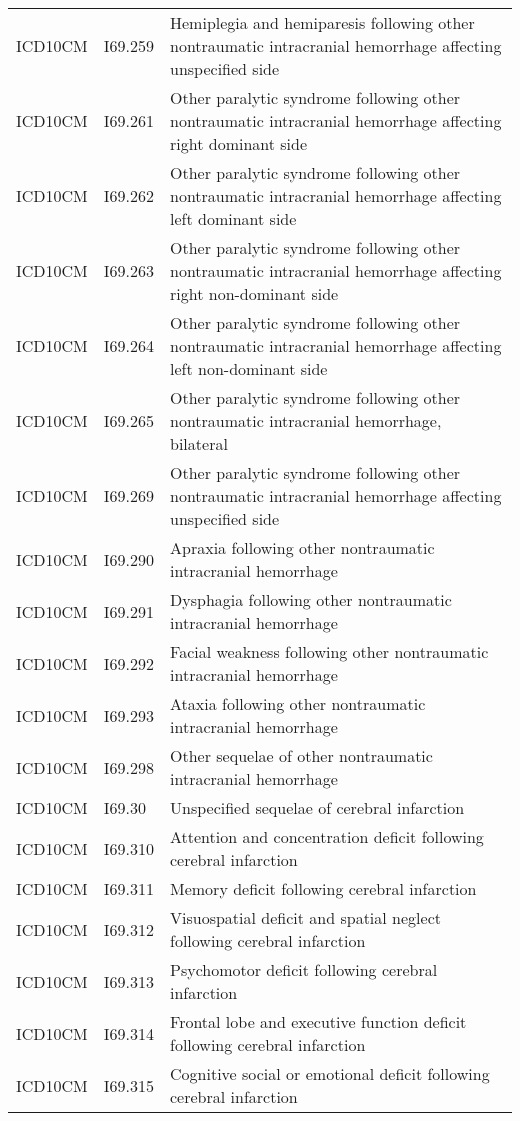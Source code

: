\begin{longtable}{p{}p{}p{}}
  ICD10CM & I69.259 & Hemiplegia and hemiparesis following other nontraumatic intracranial hemorrhage affecting unspecified side \\ 
  ICD10CM & I69.261 & Other paralytic syndrome following other nontraumatic intracranial hemorrhage affecting right dominant side \\ 
  ICD10CM & I69.262 & Other paralytic syndrome following other nontraumatic intracranial hemorrhage affecting left dominant side \\ 
  ICD10CM & I69.263 & Other paralytic syndrome following other nontraumatic intracranial hemorrhage affecting right non-dominant side \\ 
  ICD10CM & I69.264 & Other paralytic syndrome following other nontraumatic intracranial hemorrhage affecting left non-dominant side \\ 
  ICD10CM & I69.265 & Other paralytic syndrome following other nontraumatic intracranial hemorrhage, bilateral \\ 
  ICD10CM & I69.269 & Other paralytic syndrome following other nontraumatic intracranial hemorrhage affecting unspecified side \\ 
  ICD10CM & I69.290 & Apraxia following other nontraumatic intracranial hemorrhage \\ 
  ICD10CM & I69.291 & Dysphagia following other nontraumatic intracranial hemorrhage \\ 
  ICD10CM & I69.292 & Facial weakness following other nontraumatic intracranial hemorrhage \\ 
  ICD10CM & I69.293 & Ataxia following other nontraumatic intracranial hemorrhage \\ 
  ICD10CM & I69.298 & Other sequelae of other nontraumatic intracranial hemorrhage \\ 
  ICD10CM & I69.30 & Unspecified sequelae of cerebral infarction \\ 
  ICD10CM & I69.310 & Attention and concentration deficit following cerebral infarction \\ 
  ICD10CM & I69.311 & Memory deficit following cerebral infarction \\ 
  ICD10CM & I69.312 & Visuospatial deficit and spatial neglect following cerebral infarction \\ 
  ICD10CM & I69.313 & Psychomotor deficit following cerebral infarction \\ 
  ICD10CM & I69.314 & Frontal lobe and executive function deficit following cerebral infarction \\ 
  ICD10CM & I69.315 & Cognitive social or emotional deficit following cerebral infarction \\ 

\end{longtable}
